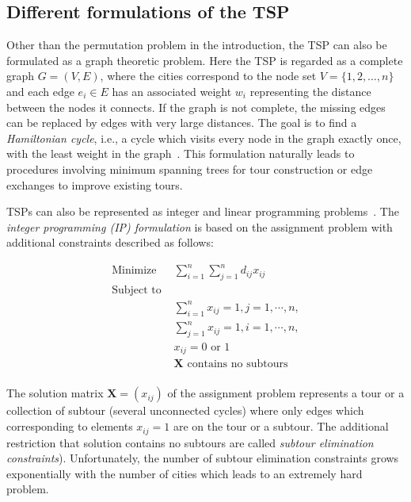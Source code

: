 \documentclass[10pt,a4paper,fleqn]{article}
\begin{document}
\subsection{Different formulations of the TSP}\label{sec:formulations}
Other than the permutation problem in the introduction, the TSP can also be
formulated as a graph theoretic problem. Here the TSP is regarded as a complete
graph $G = (V, E)$, where the cities correspond to the node set  $V =
\{1,2,\ldots,n\}$ and each edge $e_i \in E$ has an associated weight $w_i$
representing the distance between the nodes it connects.  If the graph is not
complete, the missing edges can be replaced by edges with very large distances.
The goal is to find a \emph{Hamiltonian cycle}, i.e., a cycle which visits
every node in the graph exactly once, with the least weight in the
graph~\citep{Hoffman1985}. This formulation naturally leads to procedures
involving minimum spanning trees for tour construction or edge exchanges 
to improve existing tours.

TSPs can also be represented as integer and linear programming
problems~\citep[see, e.g.,][]{Punnen2002}.  The \emph{integer programming (IP)
formulation} is based on the assignment problem with additional
constraints described as follows:


\[
\begin{array}{rl}
    \text{Minimize }     & \sum_{i=1}^n\sum_{j=1}^n{d_{ij}x_{ij}} 
                        \\[3mm]
    \text{Subject to }   & \\
                        & \sum_{i=1}^n{x_{ij}=1}, j=1,\cdots,n, \\
                        & \sum_{j=1}^n{x_{ij}=1}, i=1,\cdots,n, \\
                        & x_{ij} = 0 \text{ or } 1 \\
                        & \mathbf{X} \text{ contains no subtours}\\
\end{array}
\]

The solution matrix $\mathbf{X} = (x_{ij})$ of the assignment problem
represents a tour or a collection of subtour (several unconnected cycles) where
only edges which corresponding to elements $x_{ij} = 1$ are on the tour or a
subtour. The additional restriction that solution contains
no subtours are called \emph{subtour elimination
constraints}). Unfortunately, the number of
subtour elimination constraints grows exponentially with the number of cities
which leads to an extremely hard problem.
\end{document}
